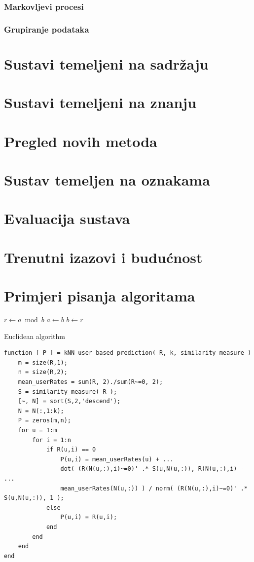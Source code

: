 \documentclass[a4paper,oneside,12pt]{memoir} %
\begin{document}
\subsection{Markovljevi procesi}
%
\subsection{Grupiranje podataka}
%
\chapter{Sustavi temeljeni na sadržaju}	

%
\chapter{Sustavi temeljeni na znanju}	
%
\chapter{Pregled novih metoda}	
%
\chapter{Sustav temeljen na oznakama}	
%
\chapter{Evaluacija sustava}	
%
\chapter{Trenutni izazovi i budućnost}	
%
\chapter{Primjeri pisanja algoritama}	
\begin{algorithm}[H]
 {
$r \leftarrow a \bmod b$\;
$a \leftarrow b$\;
$b \leftarrow r$\;
}
\caption{Euclidean algorithm}
\end{algorithm}

\begin{lstlisting}[caption=Test]
function [ P ] = kNN_user_based_prediction( R, k, similarity_measure ) 
    m = size(R,1);
    n = size(R,2);
    mean_userRates = sum(R, 2)./sum(R~=0, 2);
    S = similarity_measure( R );
    [~, N] = sort(S,2,'descend');
    N = N(:,1:k);
    P = zeros(m,n);
    for u = 1:m
        for i = 1:n
            if R(u,i) == 0
                P(u,i) = mean_userRates(u) + ...
                dot( (R(N(u,:),i)~=0)' .* S(u,N(u,:)), R(N(u,:),i) - ...
                mean_userRates(N(u,:)) ) / norm( (R(N(u,:),i)~=0)' .* S(u,N(u,:)), 1 );
            else
                P(u,i) = R(u,i);
            end
        end
    end
end
\end{lstlisting}
\end{document}
